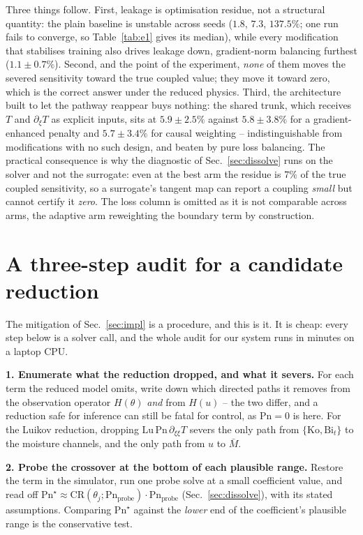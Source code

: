 \documentclass{article}
\begin{document}
Three things follow. First, leakage is optimisation residue, not a structural quantity: the plain
baseline is unstable across seeds ($1.8$, $7.3$, $137.5\%$; one run fails to converge, so
Table~\ref{tab:e1} gives its median), while every modification that stabilises training also drives
leakage down, gradient-norm balancing furthest ($1.1\pm0.7\%$). Second, and the point of the experiment, \emph{none} of them moves the severed
sensitivity toward the true coupled value; they move it toward zero, which is the correct answer under
the reduced physics. Third, the architecture built to let the pathway reappear buys nothing: the shared
trunk, which receives $T$ and $\partial_\xi T$ as explicit inputs, sits at $5.9\pm2.5\%$ against
$5.8\pm3.8\%$ for a gradient-enhanced penalty and $5.7\pm3.4\%$ for causal weighting -- indistinguishable
from modifications with no such design, and beaten by pure loss balancing. The practical consequence is
why the diagnostic of Sec.~\ref{sec:dissolve} runs on the solver and not the surrogate: even at the best
arm the residue is $7\%$ of the true coupled sensitivity, so a surrogate's tangent map can report a
coupling \emph{small} but cannot certify it \emph{zero}. The loss column is omitted as it is not
comparable across arms, the adaptive arm reweighting the boundary term by construction.

\section{A three-step audit for a candidate reduction}\label{app:procedure}
The mitigation of Sec.~\ref{sec:impl} is a procedure, and this is it. It is cheap: every step below
is a solver call, and the whole audit for our system runs in minutes on a laptop CPU.

\textbf{1. Enumerate what the reduction dropped, and what it severs.} For each term the reduced
model omits, write down which directed paths it removes from the observation operator
$H(\theta)$ \emph{and} from $H(u)$ -- the two differ, and a reduction safe for inference can still
be fatal for control, as $\mathrm{Pn}{=}0$ is here. For the Luikov reduction, dropping
$\mathrm{Lu}\,\mathrm{Pn}\,\partial_{\xi\xi}T$ severs the only path from $\{\mathrm{Ko},\mathrm{Bi}_t\}$
to the moisture channels, and the only path from $u$ to $\bar M$.

\textbf{2. Probe the crossover at the bottom of each plausible range.} Restore the term in the
simulator, run one probe solve at a small coefficient value, and read off
$\mathrm{Pn}^\star\!\approx\!\mathrm{CR}(\theta_j;\mathrm{Pn}_{\text{probe}})\cdot\mathrm{Pn}_{\text{probe}}$
(Sec.~\ref{sec:dissolve}), with its stated assumptions. Comparing $\mathrm{Pn}^\star$ against the
\emph{lower} end of the coefficient's plausible range is the conservative test.
\end{document}
